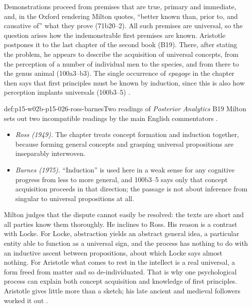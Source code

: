 Demonstrations proceed from premises that are true, primary and
immediate, and, in the Oxford rendering Milton quotes, ``better known
than, prior to, and causative of'' what they prove (71b20--2).
All such premises are universal, so the question arises how the
indemonstrable first premises are known. Aristotle postpones it to the
last chapter of the second book (B19). There, after stating the problem,
he appears to describe the acquisition of universal concepts, from
the perception of a number of individual men to the species, and from
there to the genus animal (100a3--b3). The single occurrence of \emph{epagoge} in the chapter
then says that first principles must be known by induction, since this is
also how perception implants universals (100b3--5)
\cite[pp.~5--6]{Milton2011InductionBeforeHume}.

\begin{hbwarning}{def:p15-w02b-p15-026-ross-barnes}{Two readings of \emph{Posterior Analytics} B19}
Milton sets out two incompatible readings by the main English
commentators \cite[p.~6]{Milton2011InductionBeforeHume}.
\begin{itemize}
\item \emph{Ross (1949).} The chapter treats concept formation and
  induction together, because forming general concepts and grasping
  universal propositions are inseparably interwoven.
\item \emph{Barnes (1975).} ``Induction'' is used here in a weak sense for
  any cognitive progress from less to more general, and 100b3--5 says only
  that concept acquisition proceeds in that direction; the passage is not
  about inference from singular to universal propositions at all.
\end{itemize}
Milton judges that the dispute cannot easily be resolved: the texts are
short and all parties know them thoroughly. He inclines to Ross. His reason
is a contrast with Locke. For Locke, abstraction yields an abstract general
idea, a particular entity able to function as a universal sign, and the
process has nothing to do with an inductive ascent between propositions,
about which Locke says almost nothing. For Aristotle what comes to rest in
the intellect is a real universal, a form freed from matter and so
de-individuated. That is why one psychological process can explain both
concept acquisition and knowledge of first principles. Aristotle gives
little more than a sketch; his late ancient and medieval followers worked
it out \cite[p.~6]{Milton2011InductionBeforeHume}.
\end{hbwarning}

